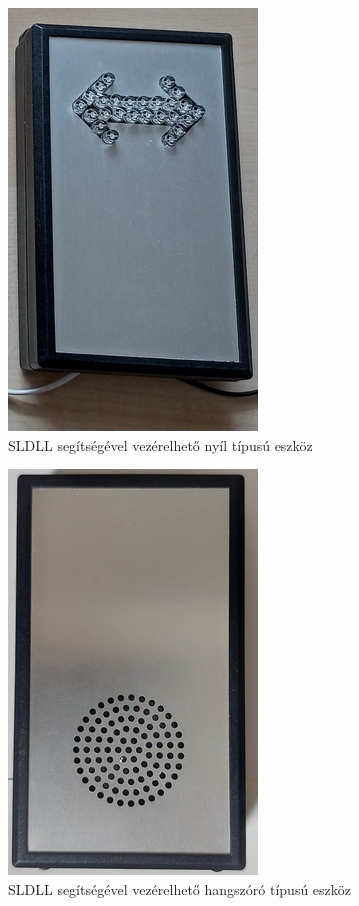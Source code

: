\documentclass[tocnopagenum]{thesis-ekf}
\begin{document}
	\begin{figure}[H]
		\centering
		\includegraphics[scale=0.45]{images/foto_nyil.jpg}
		\caption{SLDLL segítségével vezérelhető nyíl típusú eszköz}
		\label{fig:foto_nyil}
	\end{figure}

	\begin{figure}[H]
		\centering
		\includegraphics[scale=0.45]{images/foto_hangszoro.jpg}
		\caption{SLDLL segítségével vezérelhető hangszóró típusú eszköz}
		\label{fig:foto_hangszoro}
	\end{figure}
\end{document}
